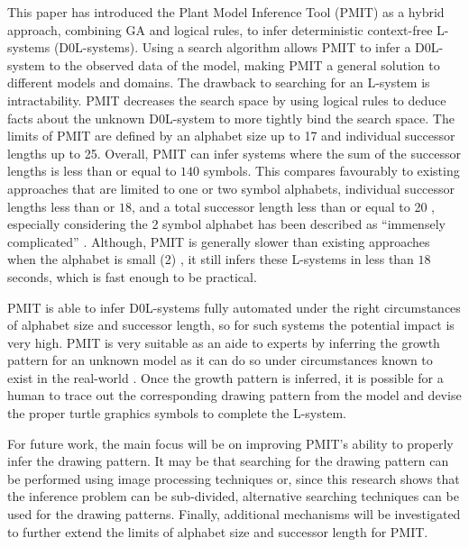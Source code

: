 \documentclass{llncs}
\begin{document}
	This paper has introduced the Plant Model Inference Tool (PMIT) as a hybrid approach, combining GA and logical rules, to infer deterministic context-free L-systems (D0L-systems). Using a search algorithm allows PMIT to infer a D0L-system to the observed data of the model, making PMIT a general solution to different models and domains. The drawback to searching for an L-system is intractability. PMIT decreases the search space by using logical rules to deduce facts about the unknown D0L-system to more tightly bind the search space. The limits of PMIT are defined by an alphabet size up to 17 and individual successor lengths up to 25. Overall, PMIT can infer systems where the sum of the successor lengths is less than or equal to $140$ symbols. This compares favourably to existing approaches that are limited to one or two symbol alphabets, individual successor lengths less than or $18$, and a total successor length less than or equal to 20 \cite{nakano_inferD0Lerrorfree,runqiang_inferGA}, especially considering the 2 symbol alphabet has been described as ``immensely complicated'' \cite{nakano_inferD0Lerrorfree}. Although, PMIT is generally slower than existing approaches when the alphabet is small (2) \cite{nakano_inferD0Lerrorfree,runqiang_inferGA}, it still infers these L-systems in less than $18$ seconds, which is fast enough to be practical.
	
	PMIT is able to infer D0L-systems fully automated under the right circumstances of alphabet size and successor length, so for such systems the potential impact is very high. PMIT is very suitable as an aide to experts by inferring the growth pattern for an unknown model as it can do so under circumstances known to exist in the real-world \cite{beauty}. Once the growth pattern is inferred, it is possible for a human to trace out the corresponding drawing pattern from the model and devise the proper turtle graphics symbols to complete the L-system.
	
	For future work, the main focus will be on improving PMIT's ability to properly infer the drawing pattern. It may be that searching for the drawing pattern can be performed using image processing techniques or, since this research shows that the inference problem can be sub-divided, alternative searching techniques can be used for the drawing patterns. Finally, additional mechanisms will be investigated to further extend the limits of alphabet size and successor length for PMIT.
	
	{}
	
	
\end{document}
